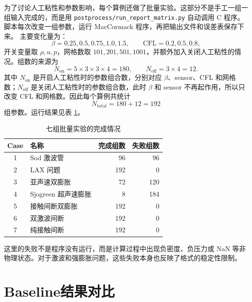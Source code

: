 \documentclass[UTF8,12pt,a4paper]{ctexart}
\begin{document}
为了讨论人工粘性和参数影响，每个算例还做了批量实验。这部分不是手工一组一组输入完成的，而是用
\verb|postprocess/run_report_matrix.py|
自动调用 C 程序。脚本每次改变一组参数，运行 MacCormack 程序，再把输出文件和误差表保存下来。
主要变化量为：
\begin{equation}
    \beta=0.25,0.5,0.75,1.0,1.5,
    \qquad
    \mathrm{CFL}=0.2,0.5,0.8,
\end{equation}
开关变量取 $\rho,u,p$，网格数取 $101,201,501,1001$，并额外加入关闭人工粘性的情况。组数的来源为
\begin{equation}
    N_{\mathrm{on}}
    =
    5\times3\times3\times4
    =
    180 ,
    \qquad
    N_{\mathrm{off}}
    =
    3\times4
    =
    12 .
\end{equation}
其中 $N_{\mathrm{on}}$ 是开启人工粘性时的参数组合数，分别对应 $\beta$、sensor、CFL 和网格数；$N_{\mathrm{off}}$ 是关闭人工粘性时的参数组合数，此时 $\beta$ 和 sensor 不再起作用，所以只改变 CFL 和网格数。因此每个算例共统计
\begin{equation}
    N_{\mathrm{total}}=180+12=192
\end{equation}
组参数。运行结果见表 \ref{tab:status}。

\begin{table}[H]
    \centering
    \caption{七组批量实验的完成情况}
    \label{tab:status}
    \begin{tabular}{clrr}
        \toprule
        Case & 名称 & 完成组数 & 失败组数 \\
        \midrule
        1 & Sod 激波管 & 96 & 96 \\
        2 & LAX 问题 & 192 & 0 \\
        3 & 亚声速双膨胀 & 72 & 120 \\
        4 & Sjogreen 超声速膨胀 & 8 & 184 \\
        5 & 接触间断双膨胀 & 192 & 0 \\
        6 & 双激波间断 & 192 & 0 \\
        7 & 纯接触间断 & 192 & 0 \\
        \bottomrule
    \end{tabular}
\end{table}

这里的失败不是程序没有运行，而是计算过程中出现负密度、负压力或 NaN 等非物理状态。对于激波和强膨胀问题，这些失败本身也反映了格式的稳定性限制。

\section{Baseline结果对比}
\end{document}
